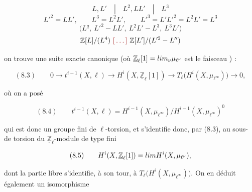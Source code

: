 \documentclass[11pt,a4paper]{article}
\begin{document}

\[ L , L' \quad | \quad L^{2}, L L' \quad | \quad L^{3} \]
\[ L'^{2} = L L' , \qquad L^{3} = L^{2} L' , \qquad L'^{3} = L' L'^{2} = L^{2} L' = L^{3} \]
\[ \bigl( L^{q},\ L'^{2} - L L',\ L^{2} L' - L^{3},\ L^{3} L' \bigr) \]
\[ \mathbb{Z}[L]/(L^{4}) \ \ill{}\ \mathbb{Z}[L'] / (L'^{2} - L'') \]



on trouve une suite exacte canonique (où
$\underline{\mathbb{Z}}_{\ell}[1] = \varprojlim_{\nu} \mu_{\ell^{\nu}}$
est le faisceau ) :

\[ (8.3) \qquad 0 \longrightarrow t^{i-1}(X, \ell) \longrightarrow H^{i}(X, \underline{\mathbb{Z}}_{\ell}[1]) \longrightarrow T_{\ell}\bigl( H^{i}(X, \mu_{\ell^{\infty}}) \bigr) \longrightarrow 0 , \]

où \struck{\ill{}} on a posé

\[ (8.4) \qquad t^{i-1}(X, \ell) = H^{i-1}(X, \mu_{\ell^{\infty}}) \big/ H^{i-1}(X, \mu_{\ell^{\infty}})^{0} \]

qui est donc un groupe fini de $\ell$-torsion, et s'identifie donc, par (8.3),
au sous-  de torsion du
$\underline{\mathbb{Z}}_{\ell}$-module de type fini

\[ (8.5) \qquad H^{i}(X, \underline{\mathbb{Z}}_{\ell}[1]) = \varprojlim H^{i}(X, \mu_{\ell^{\nu}}) , \]

dont la partie libre s'identifie, à son tour, à
$T_{\ell}\bigl( H^{i}(X, \mu_{\ell^{\infty}}) \bigr)$. On en déduit également
un isomorphisme
\end{document}
